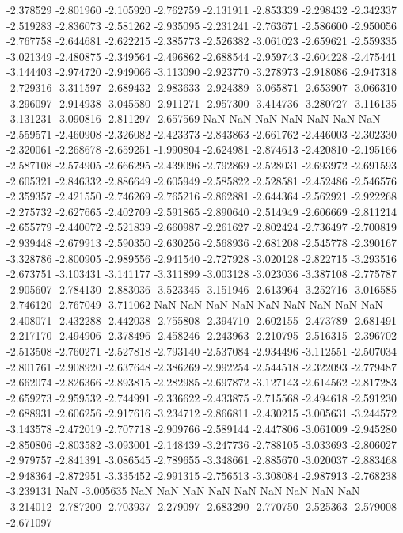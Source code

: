 -2.378529
-2.801960
-2.105920
-2.762759
-2.131911
-2.853339
-2.298432
-2.342337
-2.519283
-2.836073
-2.581262
-2.935095
-2.231241
-2.763671
-2.586600
-2.950056
-2.767758
-2.644681
-2.622215
-2.385773
-2.526382
-3.061023
-2.659621
-2.559335
-3.021349
-2.480875
-2.349564
-2.496862
-2.688544
-2.959743
-2.604228
-2.475441
-3.144403
-2.974720
-2.949066
-3.113090
-2.923770
-3.278973
-2.918086
-2.947318
-2.729316
-3.311597
-2.689432
-2.983633
-2.924389
-3.065871
-2.653907
-3.066310
-3.296097
-2.914938
-3.045580
-2.911271
-2.957300
-3.414736
-3.280727
-3.116135
-3.131231
-3.090816
-2.811297
-2.657569
NaN
NaN
NaN
NaN
NaN
NaN
NaN
-2.559571
-2.460908
-2.326082
-2.423373
-2.843863
-2.661762
-2.446003
-2.302330
-2.320061
-2.268678
-2.659251
-1.990804
-2.624981
-2.874613
-2.420810
-2.195166
-2.587108
-2.574905
-2.666295
-2.439096
-2.792869
-2.528031
-2.693972
-2.691593
-2.605321
-2.846332
-2.886649
-2.605949
-2.585822
-2.528581
-2.452486
-2.546576
-2.359357
-2.421550
-2.746269
-2.765216
-2.862881
-2.644364
-2.562921
-2.922268
-2.275732
-2.627665
-2.402709
-2.591865
-2.890640
-2.514949
-2.606669
-2.811214
-2.655779
-2.440072
-2.521839
-2.660987
-2.261627
-2.802424
-2.736497
-2.700819
-2.939448
-2.679913
-2.590350
-2.630256
-2.568936
-2.681208
-2.545778
-2.390167
-3.328786
-2.800905
-2.989556
-2.941540
-2.727928
-3.020128
-2.822715
-3.293516
-2.673751
-3.103431
-3.141177
-3.311899
-3.003128
-3.023036
-3.387108
-2.775787
-2.905607
-2.784130
-2.883036
-3.523345
-3.151946
-2.613964
-3.252716
-3.016585
-2.746120
-2.767049
-3.711062
NaN
NaN
NaN
NaN
NaN
NaN
NaN
NaN
NaN
-2.408071
-2.432288
-2.442038
-2.755808
-2.394710
-2.602155
-2.473789
-2.681491
-2.217170
-2.494906
-2.378496
-2.458246
-2.243963
-2.210795
-2.516315
-2.396702
-2.513508
-2.760271
-2.527818
-2.793140
-2.537084
-2.934496
-3.112551
-2.507034
-2.801761
-2.908920
-2.637648
-2.386269
-2.992254
-2.544518
-2.322093
-2.779487
-2.662074
-2.826366
-2.893815
-2.282985
-2.697872
-3.127143
-2.614562
-2.817283
-2.659273
-2.959532
-2.744991
-2.336622
-2.433875
-2.715568
-2.494618
-2.591230
-2.688931
-2.606256
-2.917616
-3.234712
-2.866811
-2.430215
-3.005631
-3.244572
-3.143578
-2.472019
-2.707718
-2.909766
-2.589144
-2.447806
-3.061009
-2.945280
-2.850806
-2.803582
-3.093001
-2.148439
-3.247736
-2.788105
-3.033693
-2.806027
-2.979757
-2.841391
-3.086545
-2.789655
-3.348661
-2.885670
-3.020037
-2.883468
-2.948364
-2.872951
-3.335452
-2.991315
-2.756513
-3.308084
-2.987913
-2.768238
-3.239131
NaN
-3.005635
NaN
NaN
NaN
NaN
NaN
NaN
NaN
NaN
NaN
-3.214012
-2.787200
-2.703937
-2.279097
-2.683290
-2.770750
-2.525363
-2.579008
-2.671097
